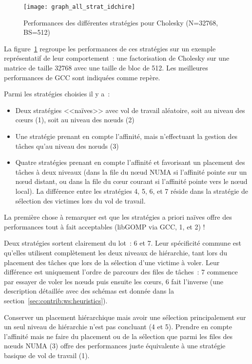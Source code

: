 \begin{figure}[ht]
  \centering
  \texttt{[image: graph\_all\_strat\_idchire]}
  \caption{Performances des différentes stratégies pour Cholesky (N=32768, BS=512)}\label{fig:contribs:perf_eval:eval-strategies}
\end{figure}

La figure~\ref{fig:contribs:perf_eval:eval-strategies} regroupe les performances de ces stratégies sur un exemple représentatif de leur comportement~: une factorisation de Cholesky sur une matrice de taille 32768 avec une taille de bloc de 512.
Les meilleures performances de GCC sont indiquées comme repère.

Parmi les stratégies choisies il y a~:
\begin{itemize}
  \item Deux stratégies <<naïves>> avec vol de travail aléatoire, soit au niveau des cœurs (1), soit au niveau des nœuds (2)
  \item Une stratégie prenant en compte l'affinité, mais n'effectuant la gestion des tâches qu'au niveau des nœuds (3)
  \item Quatre stratégies prenant en compte l'affinité et favorisant un placement des tâches à deux niveaux (dans la file du nœud NUMA si l'affinité pointe sur un nœud distant, ou dans la file du cœur courant si l'affinité pointe vers le nœud local). La différence entre les stratégies 4, 5, 6, et 7 réside dans la stratégie de sélection des victimes lors du vol de travail.
\end{itemize}

La première chose à remarquer est que les stratégies a priori naïves offre des performances tout à fait acceptables (libGOMP via GCC, 1, et 2) !

Deux stratégies sortent clairement du lot~: 6 et 7. Leur spécificité commune est qu'elles utilisent complètement les deux niveaux de hiérarchie, tant lors du placement des tâches que lors de la sélection d'une victime à voler.
Leur différence est uniquement l'ordre de parcours des files de tâches~: 7 commence par essayer de voler les nœuds puis ensuite les cœurs, 6 fait l'inverse (une description détaillée avec des schémas est donnée dans la section~\ref{sec:contrib:ws:heuristics}).

Conserver un placement hiérarchique mais avoir une sélection principalement sur un seul niveau de hiérarchie n'est pas concluant (4 et 5).
Prendre en compte l'affinité mais ne faire du placement ou de la sélection que parmi les files des nœuds NUMA (3) offre des performances juste équivalente à une stratégie basique de vol de travail (1).

